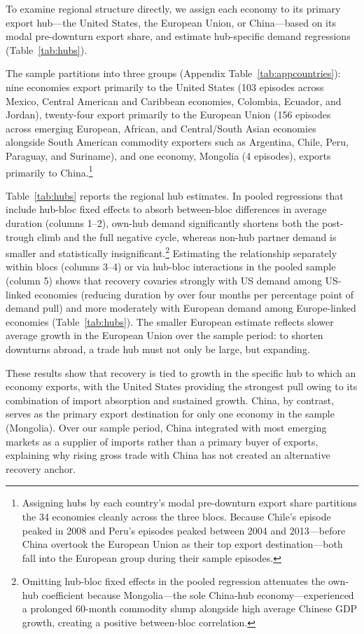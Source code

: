 \documentclass[12pt, a4paper]{article}
\begin{document}
To examine regional structure directly, we assign each economy to its primary export hub---the United States, the European Union, or China---based on its modal pre-downturn export share, and estimate hub-specific demand regressions (Table~\ref{tab:hubs}).

The sample partitions into three groups (Appendix Table~\ref{tab:appcountries}): nine economies export primarily to the United States (103 episodes across Mexico, Central American and Caribbean economies, Colombia, Ecuador, and Jordan), twenty-four export primarily to the European Union (156 episodes across emerging European, African, and Central/South Asian economies alongside South American commodity exporters such as Argentina, Chile, Peru, Paraguay, and Suriname), and one economy, Mongolia (4 episodes), exports primarily to China.\footnote{Assigning hubs by each country's modal pre-downturn export share partitions the 34 economies cleanly across the three blocs. Because Chile's episode peaked in 2008 and Peru's episodes peaked between 2004 and 2013---before China overtook the European Union as their top export destination---both fall into the European group during their sample episodes.}



Table~\ref{tab:hubs} reports the regional hub estimates. In pooled regressions that include hub-bloc fixed effects to absorb between-bloc differences in average duration (columns 1--2), own-hub demand significantly shortens both the post-trough climb and the full negative cycle, whereas non-hub partner demand is smaller and statistically insignificant.\footnote{Omitting hub-bloc fixed effects in the pooled regression attenuates the own-hub coefficient because Mongolia---the sole China-hub economy---experienced a prolonged 60-month commodity slump alongside high average Chinese GDP growth, creating a positive between-bloc correlation.} Estimating the relationship separately within blocs (columns 3--4) or via hub-bloc interactions in the pooled sample (column 5) shows that recovery covaries strongly with US demand among US-linked economies (reducing duration by over four months per percentage point of demand pull) and more moderately with European demand among Europe-linked economies (Table~\ref{tab:hubs}). The smaller European estimate reflects slower average growth in the European Union over the sample period: to shorten downturns abroad, a trade hub must not only be large, but expanding.

These results show that recovery is tied to growth in the specific hub to which an economy exports, with the United States providing the strongest pull owing to its combination of import absorption and sustained growth. China, by contrast, serves as the primary export destination for only one economy in the sample (Mongolia). Over our sample period, China integrated with most emerging markets as a supplier of imports rather than a primary buyer of exports, explaining why rising gross trade with China has not created an alternative recovery anchor.
\end{document}
